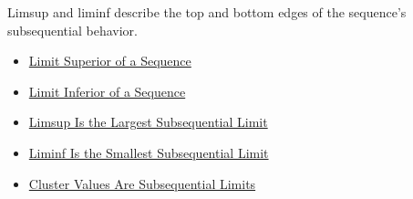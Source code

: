 \begin{remark*}[Interpretation]
Limsup and liminf describe the top and bottom edges of the sequence's
subsequential behavior.
\end{remark*}

\begin{dependencies}
\begin{itemize}
  \item \hyperref[def:limsup-sequence]{Limit Superior of a Sequence}
  \item \hyperref[def:liminf-sequence]{Limit Inferior of a Sequence}
  \item \hyperref[thm:limsup-largest-subsequential-limit]{Limsup Is the Largest Subsequential Limit}
  \item \hyperref[thm:liminf-smallest-subsequential-limit]{Liminf Is the Smallest Subsequential Limit}
  \item \hyperref[thm:cluster-values-are-subsequential-limits]{Cluster Values Are Subsequential Limits}
\end{itemize}
\end{dependencies}